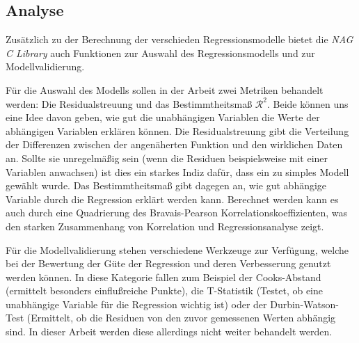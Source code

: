 \subsection{Analyse}

Zusätzlich zu der Berechnung der verschieden Regressionsmodelle bietet die {\it NAG C Library} auch Funktionen zur Auswahl des Regressionsmodells und zur Modellvalidierung.

Für die Auswahl des Modells sollen in der Arbeit zwei Metriken behandelt werden: Die Residualstreuung und das Bestimmtheitsmaß $\mathcal{R}^2$.
Beide können uns eine Idee davon geben, wie gut die unabhängigen Variablen die Werte der abhängigen Variablen erklären können.
Die Residualstreuung gibt die Verteilung der Differenzen zwischen der angenäherten Funktion und den wirklichen Daten an.
Sollte sie unregelmäßig sein (wenn die Residuen beispielsweise mit einer Variablen anwachsen) ist dies ein starkes Indiz dafür, dass ein zu simples Modell gewählt wurde. 
Das Bestimmtheitsmaß gibt dagegen an, wie gut abhängige Variable durch die Regression erklärt werden kann.
Berechnet werden kann es auch durch eine Quadrierung des Bravais-Pearson Korrelationskoeffizienten, was den starken Zusammenhang von Korrelation und Regressionsanalyse zeigt.

Für die Modellvalidierung stehen verschiedene Werkzeuge zur Verfügung, welche bei der Bewertung der Güte der Regression und deren Verbesserung genutzt werden können.
In diese Kategorie fallen zum Beispiel der Cooks-Abstand (ermittelt besonders einflußreiche Punkte), die T-Statistik (Testet, ob eine unabhängige Variable für die Regression wichtig ist) oder der Durbin-Watson-Test (Ermittelt, ob die Residuen von den zuvor gemessenen Werten abhängig sind.
In dieser Arbeit werden diese allerdings nicht weiter behandelt werden.